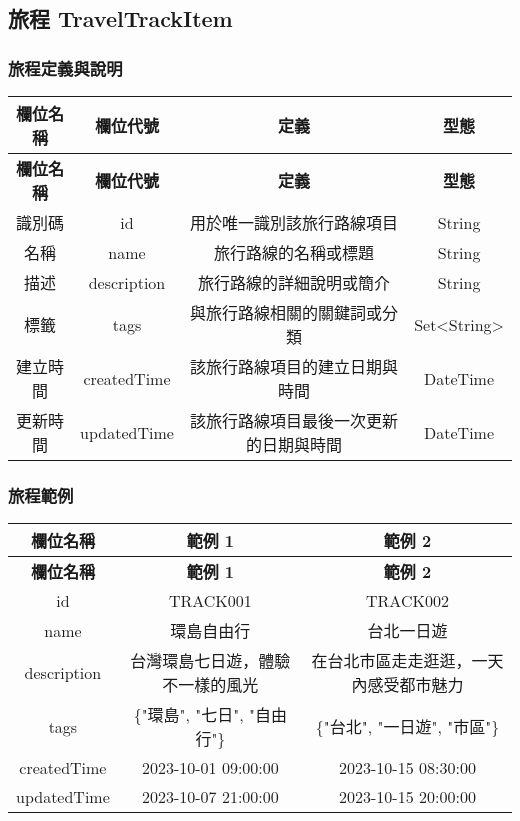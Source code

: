 \subsection{旅程 TravelTrackItem}

\subsubsection{旅程定義與說明}

\begin{longtable}{|c|c|c|c|}
  \hline
  \textbf{欄位名稱} & \textbf{欄位代號} & \textbf{定義} & \textbf{型態} \\
  \hline
  \endfirsthead
  \hline
  \textbf{欄位名稱} & \textbf{欄位代號} & \textbf{定義} & \textbf{型態} \\
  \hline
  \endhead
  
  識別碼 & id & 用於唯一識別該旅行路線項目 & String \\
  \hline
  名稱 & name & 旅行路線的名稱或標題 & String \\
  \hline
  描述 & description & 旅行路線的詳細說明或簡介 & String \\
  \hline
  標籤 & tags & 與旅行路線相關的關鍵詞或分類 & Set<String> \\
  \hline
  建立時間 & createdTime & 該旅行路線項目的建立日期與時間 & DateTime \\
  \hline
  更新時間 & updatedTime & 該旅行路線項目最後一次更新的日期與時間 & DateTime \\
  \hline
\end{longtable}

\subsubsection{旅程範例}

\begin{longtable}{|c|c|c|}
  \hline
  \textbf{欄位名稱} & \textbf{範例 1} & \textbf{範例 2} \\
  \hline
  \endfirsthead
  \hline
  \textbf{欄位名稱} & \textbf{範例 1} & \textbf{範例 2} \\
  \hline
  \endhead
  
  id & TRACK001 & TRACK002 \\
  \hline
  name & 環島自由行 & 台北一日遊 \\
  \hline
  description & 台灣環島七日遊，體驗不一樣的風光 & 在台北市區走走逛逛，一天內感受都市魅力 \\
  \hline
  tags & \{"環島", "七日", "自由行"\} & \{"台北", "一日遊", "市區"\} \\
  \hline
  createdTime & 2023-10-01 09:00:00 & 2023-10-15 08:30:00 \\
  \hline
  updatedTime & 2023-10-07 21:00:00 & 2023-10-15 20:00:00 \\
  \hline
\end{longtable}
